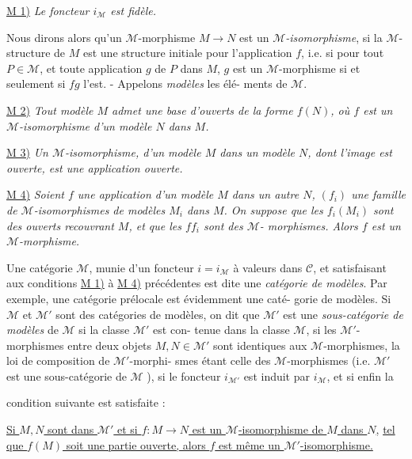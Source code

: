 \underline{M 1)} \emph{Le foncteur $i_{\mathcal{M}}$ est fidèle.}

Nous dirons alors qu'un $\mathcal{M}$-morphisme $M \to N$ est un \emph{$\mathcal{M}$-isomorphisme},
si la $\mathcal{M}$-structure de $M$ est une structure initiale pour l'application $f$,
i.e. si pour tout $P \in \mathcal{M}$, et toute application $g$ de $P$ dans $M$, $g$ est un
$\mathcal{M}$-morphisme si et seulement si $f g$ l'est. - Appelons \emph{modèles} les élé-
ments de $\mathcal{M}$.

\underline{M 2)} \emph{Tout modèle $M$ admet une base d'ouverts de la forme $f(N)$, où $f$ est un
$\mathcal{M}$-isomorphisme d'un modèle $N$ dans $M$.}

\underline{M 3)} \emph{Un $\mathcal{M}$-isomorphisme, d'un modèle $M$ dans un modèle $N$, dont l'image
est ouverte, est une application ouverte.}

\underline{M 4)} \emph{Soient $f$ une application d'un modèle $M$ dans un autre $N$, $(f_i)$ une
famille de $\mathcal{M}$-isomorphismes de modèles $M_i$ dans $M$. On suppose que les
$f_i(M_i)$ sont des ouverts recouvrant $M$, et que les $f f_i$ sont des $\mathcal{M}$-
morphismes. Alors $f$ est un $\mathcal{M}$-morphisme.}

Une catégorie $\mathcal{M}$, munie d'un foncteur $i=i_{\mathcal{M}}$ à valeurs dans $\mathcal{C}$, et
satisfaisant aux conditions \underline{M 1)} à \underline{M 4)} précédentes est dite une \emph{catégorie
de modèles}. Par exemple, une catégorie prélocale est évidemment une caté-
gorie de modèles. Si $\mathcal{M}$ et $\mathcal{M}'$ sont des catégories de modèles, on dit
que $\mathcal{M}'$ est une \emph{sous-catégorie de modèles} de $\mathcal{M}$ si la classe $\mathcal{M}'$ est con-
tenue dans la classe $\mathcal{M}$, si les $\mathcal{M}'$-morphismes entre deux objets $M, N \in \mathcal{M}'$
sont identiques aux $\mathcal{M}$-morphismes, la loi de composition de $\mathcal{M}'$-morphi-
smes étant celle des $\mathcal{M}$-morphismes (i.e. $\mathcal{M}'$ est une sous-catégorie de
$\mathcal{M}$ ), si le foncteur $i_{\mathcal{M}'}$ est induit par $i_{\mathcal{M}}$, et si enfin la

\newpage



condition suivante est satisfaite :

\underline{Si $M,N$ sont dans $\mathcal{M}'$ et si $f: M \to N$ est un $\mathcal{M}$-isomorphisme de $M$ dans $N$,}
\underline{tel que $f(M)$ soit une partie ouverte, alors $f$ est même un $\mathcal{M}'$-isomorphisme.}

